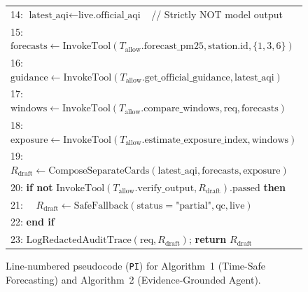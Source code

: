 \begin{figure}[!t]
{\begin{tabular}{@{}l@{}}
14: $\text{latest\_aqi} \leftarrow \text{live.official\_aqi}$ \ // Strictly NOT model output\\
15: $\text{forecasts} \leftarrow \text{InvokeTool}(T_{\text{allow}}.\text{forecast\_pm25}, \text{station.id}, \{1,3,6\})$\\
16: $\text{guidance} \leftarrow \text{InvokeTool}(T_{\text{allow}}.\text{get\_official\_guidance}, \text{latest\_aqi})$\\
17: $\text{windows} \leftarrow \text{InvokeTool}(T_{\text{allow}}.\text{compare\_windows}, \text{req}, \text{forecasts})$\\
18: $\text{exposure} \leftarrow \text{InvokeTool}(T_{\text{allow}}.\text{estimate\_exposure\_index}, \text{windows})$\\
19: $R_{\text{draft}} \leftarrow \text{ComposeSeparateCards}(\text{latest\_aqi}, \text{forecasts}, \text{exposure})$\\
20: \textbf{if not} $\text{InvokeTool}(T_{\text{allow}}.\text{verify\_output}, R_{\text{draft}}).\text{passed}$ \textbf{then}\\
21: \ \ $R_{\text{draft}} \leftarrow \text{SafeFallback}(\text{status}=\text{"partial"}, \text{qc}, \text{live})$\\
22: \textbf{end if}\\
23: $\text{LogRedactedAuditTrace}(\text{req}, R_{\text{draft}})$; \textbf{return} $R_{\text{draft}}$\\
\bottomrule
\end{tabular}%
}
\caption{Line-numbered pseudocode (\texttt{PI}) for Algorithm~1 (Time-Safe Forecasting) and Algorithm~2 (Evidence-Grounded Agent).}
\label{fig:algos}
\end{figure}

